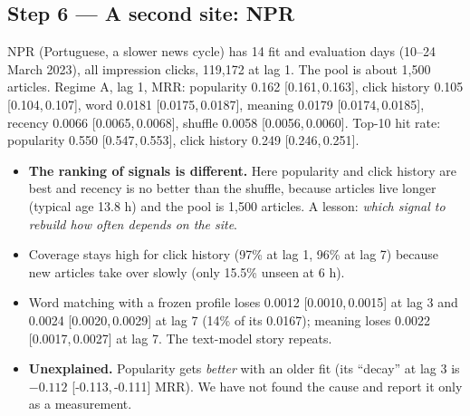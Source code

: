 \documentclass[11pt,a4paper]{article}
\newcommand{\ci}[2]{[#1,\,#2]}
\begin{document}
\subsection{Step 6 --- A second site: NPR}
NPR (Portuguese, a slower news cycle) has 14 fit and evaluation days (10--24 March 2023), all impression clicks, 119,172 at lag 1. The pool is about 1,500 articles. Regime A, lag 1, MRR: popularity 0.162 \ci{0.161}{0.163}, click history 0.105 \ci{0.104}{0.107}, word 0.0181 \ci{0.0175}{0.0187}, meaning 0.0179 \ci{0.0174}{0.0185}, recency 0.0066 \ci{0.0065}{0.0068}, shuffle 0.0058 \ci{0.0056}{0.0060}. Top-10 hit rate: popularity 0.550 \ci{0.547}{0.553}, click history 0.249 \ci{0.246}{0.251}.
\begin{itemize}
\item \textbf{The ranking of signals is different.} Here popularity and click history are best and recency is no better than the shuffle, because articles live longer (typical age 13.8 h) and the pool is 1,500 articles. A lesson: \emph{which signal to rebuild how often depends on the site}.
\item Coverage stays high for click history (97\% at lag 1, 96\% at lag 7) because new articles take over slowly (only 15.5\% unseen at 6 h).
\item Word matching with a frozen profile loses 0.0012 \ci{0.0010}{0.0015} at lag 3 and 0.0024 \ci{0.0020}{0.0029} at lag 7 (14\% of its 0.0167); meaning loses 0.0022 \ci{0.0017}{0.0027} at lag 7. The text-model story repeats.
\item \textbf{Unexplained.} Popularity gets \emph{better} with an older fit (its ``decay'' at lag 3 is $-0.112$ \ci{-0.113}{-0.111} MRR). We have not found the cause and report it only as a measurement.
\end{itemize}
\end{document}
